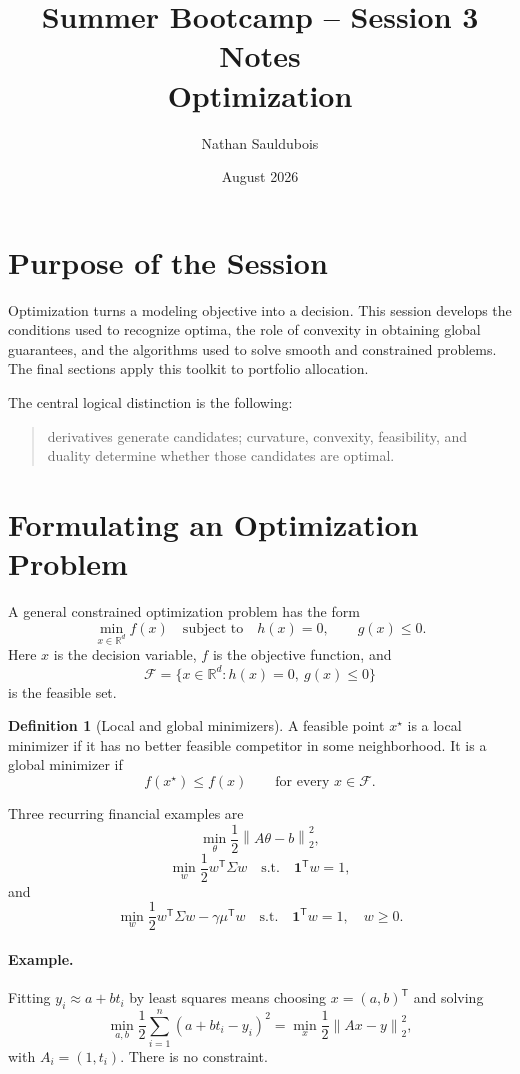 \documentclass[11pt]{article}
\title{Summer Bootcamp -- Session 3 Notes\\Optimization}
\author{Nathan Sauldubois}
\date{August 2026}
\newcommand{\R}{\mathbb{R}}
\newcommand{\trans}{^{\mathsf T}}
\newcommand{\norm}[1]{\left\lVert#1\right\rVert}
\theoremstyle{definition}
\newtheorem{definition}{Definition}[section]
\theoremstyle{remark}
\begin{document}
\maketitle

\section*{Purpose of the Session}

Optimization turns a modeling objective into a decision. This session develops
the conditions used to recognize optima, the role of convexity in obtaining
global guarantees, and the algorithms used to solve smooth and constrained
problems. The final sections apply this toolkit to portfolio allocation.

The central logical distinction is the following:
\begin{quote}
derivatives generate candidates; curvature, convexity, feasibility, and
duality determine whether those candidates are optimal.
\end{quote}

\section{Formulating an Optimization Problem}

A general constrained optimization problem has the form
\[
  \min_{x\in\R^d} f(x)
  \quad\text{subject to}\quad
  h(x)=0,\qquad g(x)\leq0.
\]
Here $x$ is the decision variable, $f$ is the objective function, and
\[
  \mathcal F=\{x\in\R^d:h(x)=0,\ g(x)\leq0\}
\]
is the feasible set.

\begin{definition}[Local and global minimizers]
A feasible point $x^\star$ is a local minimizer if it has no better feasible
competitor in some neighborhood. It is a global minimizer if
\[
  f(x^\star)\leq f(x)\qquad\text{for every }x\in\mathcal F.
\]
\end{definition}

Three recurring financial examples are
\[
  \min_\theta \frac12\norm{A\theta-b}_2^2,
\]
\[
  \min_w\frac12w\trans\Sigma w
  \quad\text{s.t.}\quad \mathbf1\trans w=1,
\]
and
\[
  \min_w\frac12w\trans\Sigma w-\gamma\mu\trans w
  \quad\text{s.t.}\quad \mathbf1\trans w=1,\quad w\geq0.
\]

\paragraph{Example.}
Fitting $y_i\approx a+bt_i$ by least squares means choosing
$x=(a,b)\trans$ and solving
\[
  \min_{a,b}\frac12\sum_{i=1}^n(a+bt_i-y_i)^2
  =\min_x\frac12\norm{Ax-y}_2^2,
\]
with $A_i=(1,t_i)$. There is no constraint.
\end{document}
